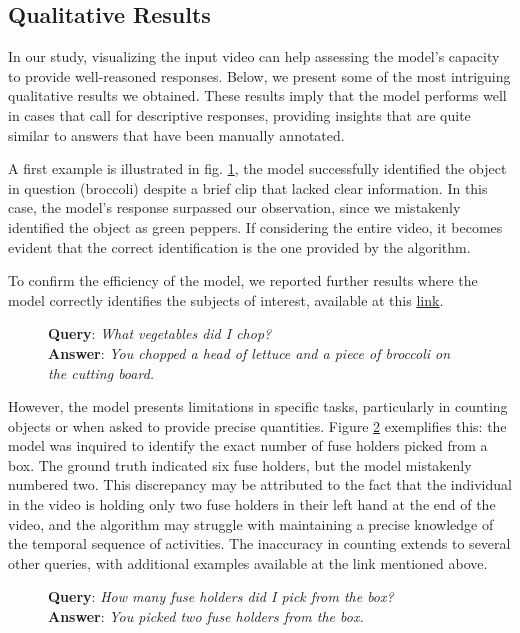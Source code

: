 \documentclass[10pt,twocolumn,letterpaper]{article}
\begin{document}
\subsection{Qualitative Results}
In our study, visualizing the input video can help assessing the model's capacity to provide well-reasoned responses. Below, we present some of the most intriguing qualitative results we obtained. These results imply that the model performs well in cases that call for descriptive responses, providing insights that are quite similar to answers that have been manually annotated.

A first example is illustrated in fig. \ref{fig:animation1}, the model successfully identified the object in question (broccoli) despite a brief clip that lacked clear information. In this case, the model's response surpassed our observation, since we mistakenly identified the object as green peppers. If considering the entire video, it becomes evident that the correct identification is the one provided by the algorithm.

To confirm the efficiency of the model, we reported further results where the model correctly identifies the subjects of interest, available at this \href{https://github.com/Gin549/episodic-memory-pers/tree/main/qualitative_results}{link}.

\begin{figure}[ht]
  \centering
  \captionsetup{justification=centering} %
  \caption{\textbf{Query}: \textit{What vegetables did I chop?} \\\textbf{Answer}: \textit{You chopped a head of lettuce and a piece of broccoli on the cutting board.}}
  \label{fig:animation1}
\end{figure}


However, the model presents limitations in specific tasks, particularly in counting objects or when asked to provide precise quantities. Figure \ref{fig:animation2} exemplifies this: the model was inquired to identify the exact number of fuse holders picked from a box. The ground truth indicated six fuse holders, but the model mistakenly numbered two. This discrepancy may be attributed to the fact that the individual in the video is holding only two fuse holders in their left hand at the end of the video, and the algorithm may struggle with maintaining a precise knowledge of the temporal sequence of activities.
The inaccuracy in counting extends to several other queries, with additional examples available at the link mentioned above.
\begin{figure}[ht]
  \centering
  \captionsetup{justification=centering} %
    \caption{\textbf{Query}: \textit{How many fuse holders did I pick from the box?} \\\textbf{Answer}: \textit{You picked two fuse holders from the box.}}
  \label{fig:animation2}
\end{figure}
\end{document}
